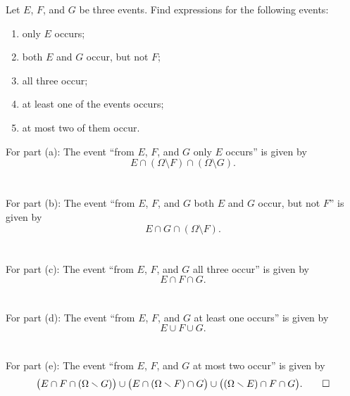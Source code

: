 \begin{problem}[Handout 1, \# 11]
  Let \(E\), \(F\), and \(G\) be three events. Find expressions for the
  following events:
  \begin{enumerate}[label=(\alph*),noitemsep]
  \item only \(E\) occurs;
  \item both \(E\) and \(G\) occur, but not \(F\);
  \item all three occur;
  \item at least one of the events occurs;
  \item at most two of them occur.
  \end{enumerate}
\end{problem}
\begin{solution*}
  For part (a): The event ``from \(E\), \(F\), and \(G\) only \(E\)
  occurs'' is given by
  \[
    E\cap(\Omega\setminus F)\cap(\Omega\setminus G).
  \]
  \\\\
  For part (b): The event ``from \(E\), \(F\), and \(G\) both \(E\) and
  \(G\) occur, but not \(F\)'' is given by
  \[
    E\cap G\cap(\Omega\setminus F).
  \]
  \\\\
  For part (c): The event ``from \(E\), \(F\), and \(G\) all three occur''
  is given by
  \[
    E\cap F\cap G.
  \]
  \\\\
  For part (d): The event ``from \(E\), \(F\), and \(G\) at least one
  occurs'' is given by
  \[
    E\cup F\cup G.
  \]
  \\\\
  For part (e): The event ``from \(E\), \(F\), and \(G\) at most two
  occur'' is given by
  \[
    \bigl(E\cap F\cap(\Omega\setminus G)\bigr)\cup%
    \bigl(E\cap (\Omega\setminus F)\cap G\bigr)\cup%
    \bigl((\Omega\setminus E)\cap F\cap G\bigr).\qedhere
  \]
\end{solution*}

